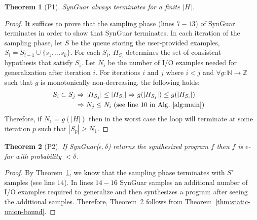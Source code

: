 \documentclass[11pt]{extarticle}
\newtheorem{theorem}{Theorem}[section]
\newcommand{\tool}{{\sc SynGuar}\xspace}
\newcommand{\parf}{g}
\begin{document}
\begin{theorem}[P1]
\label{thm:p1}
\tool always terminates for a finite $|H|$.
\end{theorem}
\begin{proof}
It suffices to prove that the sampling phase (lines $7-13$) of \tool terminates in order to show that \tool terminates.
In each iteration of the sampling phase,  let $S$ be the queue storing the user-provided examples, $S_i = S_{i-1}\cup\{s_1,...s_k\}$. For each $S_i$, $H_{S_i}$ determines the set of consistent hypothesis that satisfy $S_i$. Let $N_i$ be the number of I/O examples needed for generalization after iteration $i$. 
%
For iterations $i$ and $j$ where $i<j$ and $\forall g:\mathbb{N} \rightarrow \mathbb{Z}$ such that $g$ is monotonically non-decreasing, the following holds: 
\begin{align*}
  S_i\subset S_j &\Rightarrow |H_{S_j}|\leq |H_{S_i}| \Rightarrow g(|H_{S_j}|) \leq g(|H_{S_i}|)\\
  &\Rightarrow N_j \leq N_i\text{ (see line $10$ in Alg.~\ref{alg:main})}
\end{align*}
Therefore, if $N_1 = g(|H|)$ then in the worst case the loop will terminate at some iteration $p$ such that $|S_p|\geq N_1$.
\end{proof}

\begin{theorem}[P2]
\label{thm:p2}
If \tool($\epsilon, \delta$) returns the synthesized program $f$ then $f$ is $\epsilon$-far with probability $<\delta$.
\end{theorem}
\begin{proof}
By Theorem~\ref{thm:p1}, we know that the sampling phase terminates with $S'$ samples (see line $14$). In lines $14-16$ \tool samples an additional number of I/O examples required to generalize and then synthesizes a program after seeing the additional samples. Therefore, Theorem~\ref{thm:p2} follows from Theorem~\ref{thm:static-union-bound}.
\end{proof}
\end{document}
